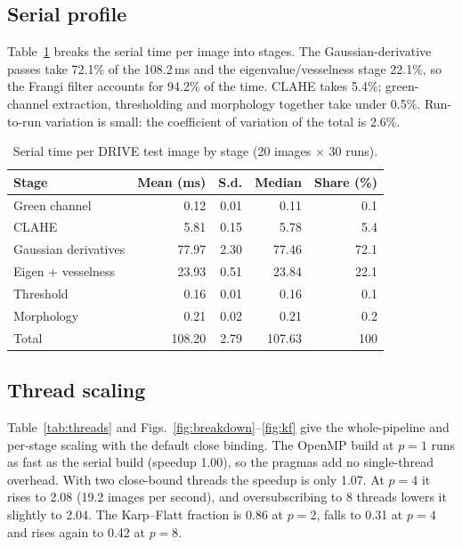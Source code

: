 \subsection{Serial profile}
Table~\ref{tab:serial} breaks the serial time per image into stages. The Gaussian-derivative passes take
72.1\% of the 108.2\,ms and the eigenvalue/vesselness stage 22.1\%, so the Frangi filter accounts for 94.2\% of
the time. CLAHE takes 5.4\%; green-channel extraction, thresholding and morphology together take under 0.5\%.
Run-to-run variation is small: the coefficient of variation of the total is 2.6\%.

\begin{table}[t]
\centering
\caption{Serial time per DRIVE test image by stage (20 images $\times$ 30 runs).}\label{tab:serial}
\footnotesize
\begin{tabular}{@{}lrrrr@{}}
\toprule
Stage & Mean (ms) & S.d. & Median & Share (\%) \\
\midrule
Green channel & 0.12 & 0.01 & 0.11 & 0.1 \\
CLAHE & 5.81 & 0.15 & 5.78 & 5.4 \\
Gaussian derivatives & 77.97 & 2.30 & 77.46 & 72.1 \\
Eigen + vesselness & 23.93 & 0.51 & 23.84 & 22.1 \\
Threshold & 0.16 & 0.01 & 0.16 & 0.1 \\
Morphology & 0.21 & 0.02 & 0.21 & 0.2 \\
\midrule
Total & 108.20 & 2.79 & 107.63 & 100 \\
\bottomrule
\end{tabular}
\end{table}

\subsection{Thread scaling}
Table~\ref{tab:threads} and Figs.~\ref{fig:breakdown}--\ref{fig:kf} give the whole-pipeline and per-stage
scaling with the default close binding. The OpenMP build at $p=1$ runs as fast as the serial build (speedup
1.00), so the pragmas add no single-thread overhead. With two close-bound threads the speedup is only 1.07. At
$p=4$ it rises to 2.08 (19.2 images per second), and oversubscribing to 8 threads lowers it slightly to 2.04.
The Karp--Flatt fraction is 0.86 at $p=2$, falls to 0.31 at $p=4$ and rises again to 0.42 at $p=8$.

